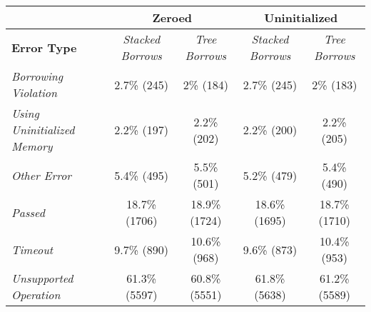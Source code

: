 \centering
\small
\begin{tabular}{l|cc|cc|}
\cline{2-5}
\multicolumn{1}{c|}{\textbf{}}                            & \multicolumn{2}{c|}{\textbf{Zeroed}}                                  & \multicolumn{2}{c|}{\textbf{Uninitialized}}                           \\ \hline
\multicolumn{1}{|l|}{\textbf{Error Type}}                 & \multicolumn{1}{c|}{\textit{Stacked Borrows}} & \textit{Tree Borrows} & \multicolumn{1}{c|}{\textit{Stacked Borrows}} & \textit{Tree Borrows} \\ \hline\hline
\multicolumn{1}{|l|}{\textit{Borrowing Violation}}        & \multicolumn{1}{c|}{2.7\% (245)}              & 2\% (184)             & \multicolumn{1}{c|}{2.7\% (245)}              & 2\% (183)             \\ \hline
\multicolumn{1}{|l|}{\textit{Using Uninitialized Memory}} & \multicolumn{1}{c|}{2.2\% (197)}              & 2.2\% (202)           & \multicolumn{1}{c|}{2.2\% (200)}              & 2.2\% (205)           \\ \hline
\multicolumn{1}{|l|}{\textit{Other Error}}                & \multicolumn{1}{c|}{5.4\% (495)}              & 5.5\% (501)           & \multicolumn{1}{c|}{5.2\% (479)}              & 5.4\% (490)           \\ \hline
\multicolumn{1}{|l|}{\textit{Passed}}                     & \multicolumn{1}{c|}{18.7\% (1706)}            & 18.9\% (1724)         & \multicolumn{1}{c|}{18.6\% (1695)}            & 18.7\% (1710)         \\ \hline
\multicolumn{1}{|l|}{\textit{Timeout}}                    & \multicolumn{1}{c|}{9.7\% (890)}              & 10.6\% (968)          & \multicolumn{1}{c|}{9.6\% (873)}              & 10.4\% (953)          \\ \hline
\multicolumn{1}{|l|}{\textit{Unsupported Operation}}      & \multicolumn{1}{c|}{61.3\% (5597)}            & 60.8\% (5551)         & \multicolumn{1}{c|}{61.8\% (5638)}            & 61.2\% (5589)         \\ \hline
\end{tabular}